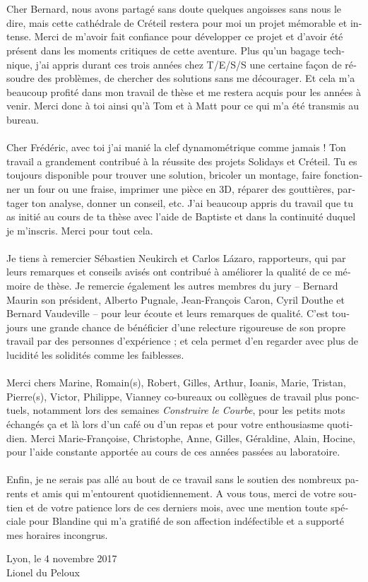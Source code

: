\begin{otherlanguage}{french}
\\
\\
Cher Bernard, nous avons partagé sans doute quelques angoisses sans nous le dire, mais cette cathédrale de Créteil restera pour moi un projet mémorable et intense. Merci de m'avoir fait confiance pour développer ce projet et d'avoir été présent dans les moments critiques de cette aventure. Plus qu'un bagage technique, j'ai appris durant ces trois années chez T/E/S/S une certaine façon de résoudre des problèmes, de chercher des solutions sans me décourager. Et cela m'a beaucoup profité dans mon travail de thèse et me restera acquis pour les années à venir. Merci donc à toi ainsi qu'à Tom et à Matt pour ce qui m'a été transmis au bureau.
\\
\\
Cher Frédéric, avec toi j'ai manié la clef dynamométrique comme jamais ! Ton travail a grandement contribué à la réussite des projets Solidays et Créteil. Tu es toujours disponible pour trouver une solution, bricoler un montage, faire fonctionner un four ou une fraise, imprimer une pièce en 3D, réparer des gouttières, partager ton analyse, donner un conseil, etc. J'ai beaucoup appris du travail que tu as initié au cours de ta thèse avec l'aide de Baptiste et dans la continuité duquel je m'inscris. Merci pour tout cela.
\\
\\
Je tiens à remercier Sébastien Neukirch et Carlos Lázaro, rapporteurs, qui par leurs remarques et conseils avisés ont contribué à améliorer la qualité de ce mémoire de thèse. Je remercie également les autres membres du jury -- Bernard Maurin son président, Alberto Pugnale, Jean-François Caron, Cyril Douthe et Bernard Vaudeville -- pour leur écoute et leurs remarques de qualité. C'est toujours une grande chance de bénéficier d'une relecture rigoureuse de son propre travail par des personnes d'expérience ; et cela permet d'en regarder avec plus de lucidité les solidités comme les faiblesses.
\\
\\
Merci chers Marine, Romain(s), Robert, Gilles, Arthur, Ioanis, Marie, Tristan, Pierre(s), Victor, Philippe, Vianney \telp{} co-bureaux ou collègues de travail plus ponctuels, notamment lors des semaines \emph{Construire le Courbe}, pour les petits mots échangés ça et là lors d'un café ou d'un repas et pour votre enthousiasme quotidien. Merci Marie-Françoise, Christophe, Anne, Gilles, Géraldine, Alain, Hocine, pour l'aide constante apportée au cours de ces années passées au laboratoire.
\\
\\
Enfin, je ne serais pas allé au bout de ce travail sans le soutien des nombreux parents et amis qui m'entourent quotidiennement. A vous tous, merci de votre soutien et de votre patience lors de ces derniers mois, avec une mention toute spéciale pour Blandine qui m'a gratifié de son affection indéfectible et a supporté mes horaires incongrus.

\bigskip
\bigskip

\begin{flushright}
Lyon, le 4 novembre 2017\\
Lionel du Peloux
\end{flushright}

\end{otherlanguage}
